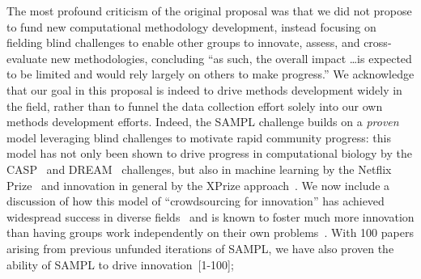 \documentclass[11pt]{article}
\begin{document}
The most profound criticism of the original proposal was that we did not propose to fund new computational methodology development, instead focusing on fielding blind challenges to enable other groups to innovate, assess, and cross-evaluate new methodologies, concluding ``as such, the overall impact \ldots is expected to be limited and would rely largely on others to make progress.''
We acknowledge that our goal in this proposal is indeed to drive methods development widely in the field, rather than to funnel the data collection effort solely into our own methods development efforts.
Indeed, the SAMPL challenge builds on a \emph{proven} model leveraging blind challenges to motivate rapid community progress: this model has not only been shown to drive progress in computational biology by the CASP~\cite{Moult:2014:Proteins, Monastyrskyy:2016:Proteins, Moult:2016:Proteins} and DREAM~\cite{Prill:2011:Sci.Signal., Eisenstein:2013:NatBiotech, Saez-Rodriguez:2016:NatRevGenet} challenges, but also in machine learning by the Netflix Prize~\cite{Bell:2010:CHANCE} and innovation in general by the XPrize approach~\cite{::XPRIZE, Kay:2011:R&DManage, XPrize:2017:Wikipedia}. 
We now include a discussion of how this model of ``crowdsourcing for innovation'' has achieved widespread success in diverse fields~\cite{Kay:2011:R&DManage, Saez-Rodriguez:2016:NatRevGenet} and is known to foster much more innovation than having groups work independently on their own problems~\cite{Bell:2010:CHANCE, Kay:2011:R&DManage, Saez-Rodriguez:2016:NatRevGenet}.
With 100 papers arising from previous unfunded iterations of SAMPL, we have also proven the ability of SAMPL to drive innovation~[1-100];
\end{document}
